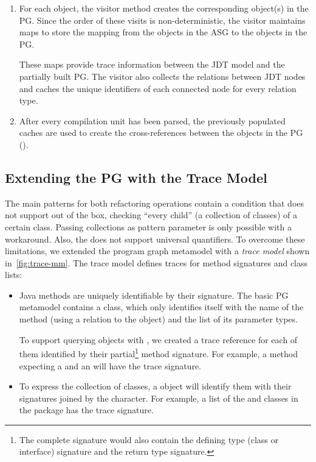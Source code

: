 \documentclass[submission,copyright,creativecommons]{eptcs}
\begin{document}
\begin{enumerate}[noitemsep]
\item For each object, the visitor method creates the corresponding object(s) in the PG. Since the order of these visits is non-deterministic, the visitor maintains maps to store the mapping from the objects in the ASG to the objects in the PG.

These maps provide trace information between the JDT model and the partially built PG. The visitor also collects the relations between JDT nodes and caches the unique identifiers of each connected node for every relation type. 

\item After every compilation unit has been parsed, the previously populated caches are used to create the cross-references between the objects in the PG (\eg {}).
\end{enumerate}

\subsection[Extending the PG with the Trace Model]{Extending the PG with the Trace Model\qquad{}}


\noindent The main patterns for both refactoring operations contain a condition that \eiq does not support out of the box, \eg checking ``every child'' (a collection of classes) of a certain class. Passing collections as pattern parameter is only possible with a workaround. Also, the \iqpl does not support universal quantifiers. To overcome these limitations, we extended the program graph metamodel with a \emph{trace model} shown in~\autoref{fig:trace-mm}. The trace model defines traces for method signatures and class lists:

\begin{itemize}[noitemsep]
\item {} Java methods are uniquely identifiable by their signature. The basic PG metamodel contains a  class, which only identifies itself with the name of the method (using a relation to the  object) and the list of its parameter types.

To support querying  objects with \eiq, we created a trace reference for each of them identified by their partial\footnote{The complete signature would also contain the defining type (class or interface) signature and the return type signature.} method signature. For example, a method  expecting a  and an  will have the  trace signature.
\item {} To express the collection of classes, a  object will identify them with their signatures joined by the \ttctt{\#} character. For example, a list of the  and  classes in the  package has the  trace signature.
\end{itemize}
\end{document}
